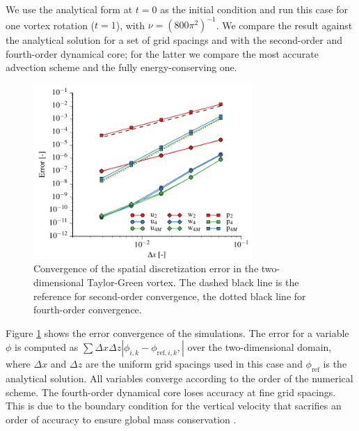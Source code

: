 \documentclass[gmd,manuscript]{copernicus}
\begin{document}
We use the analytical form at $t=0$ as the initial condition and run this case for one vortex rotation ($t = 1$), with $\nu = (800 \pi^2)^{-1}$. We compare the result against the analytical solution for a set of grid spacings and with the second-order and fourth-order dynamical core; for the latter we compare the most accurate advection scheme and the fully energy-conserving one.
\begin{figure}[t]
	\vspace*{2mm}
	\begin{center}
		\includegraphics[width=8.3cm]{figs/taylorgreen.pdf}
	\end{center}
	\caption{Convergence of the spatial discretization error in the two-dimensional Taylor-Green vortex. The dashed black line is the reference for second-order convergence, the dotted black line for fourth-order convergence.}\label{fig:taylorgreen}
\end{figure}

Figure \ref{fig:taylorgreen} shows the error convergence of the simulations. The error for a variable $\phi$ is computed as $\sum \Delta x \Delta z \left| \phi_{i,k} - \phi_{\textrm{ref},i,k}, \right|$ over the two-dimensional domain, where $\Delta x$ and $\Delta z$ are the uniform grid spacings used in this case and $\phi_{\textrm{ref}}$ is the analytical solution. All variables converge according to the order of the numerical scheme. The fourth-order dynamical core loses accuracy at fine grid spacings. This is due to the boundary condition for the vertical velocity that sacrifies an order of accuracy to ensure global mass conservation \citep{Morinishi1998}.
\end{document}
